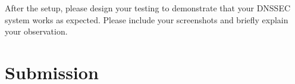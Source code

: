 After the setup, please design your testing to demonstrate 
that your DNSSEC system works as expected. Please include your screenshots
and briefly explain your observation. 




\section{Submission}

\seedsubmission 




